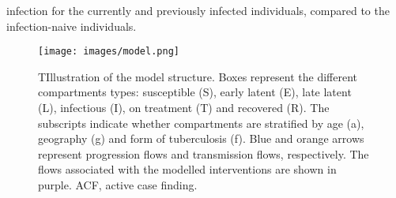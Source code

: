 infection for the currently and previously infected individuals, compared to the infection-naive 
individuals.
\begin{figure}[!htbp]
    \texttt{[image: images/model.png]}
    \caption{TIllustration of the model structure. 
    Boxes represent the different compartments types: susceptible (S), early latent (E), late latent (L), infectious (I), on treatment (T) and recovered (R). The subscripts indicate whether compartments are stratified by age (a), geography (g) and form of tuberculosis (f). Blue and orange arrows represent progression flows and transmission flows, respectively. 
    The flows associated with the modelled interventions are shown in purple. ACF, active case finding.}
    \label{fig:model}
\end{figure}


